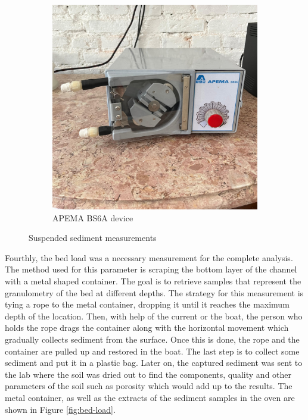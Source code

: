 \begin{figure}[H]
\begin{subfigure}[t]{0.48\textwidth}
        \includegraphics[width=\linewidth]{figures/ch4/APEMA BS6A.jpg}
        \caption{APEMA BS6A device}
    \end{subfigure}
    \caption{Suspended sediment measurements}
    \label{fig:suspended-sediment}
\end{figure}






Fourthly, the bed load was a necessary measurement for the complete analysis. The method used for this parameter is scraping the bottom layer of the channel with a metal shaped container. The goal is to retrieve samples that represent the granulometry of the bed at different depths. 
The strategy for this measurement is tying a rope to the metal container, dropping it until it reaches the maximum depth of the location. Then, with help of the current or the boat, the person who holds the rope drags the container along with the horizontal movement which gradually collects sediment from the surface. Once this is done, the rope and the container are pulled up and restored in the boat. The last step is to collect some sediment and put it in a plastic bag.  Later on, the captured sediment was sent to the lab where the soil was dried out to find the components, quality and other parameters of the soil such as porosity which would add up to the results. The metal container, as well as the extracts of the sediment samples in the oven are shown in Figure \ref{fig:bed-load}.

